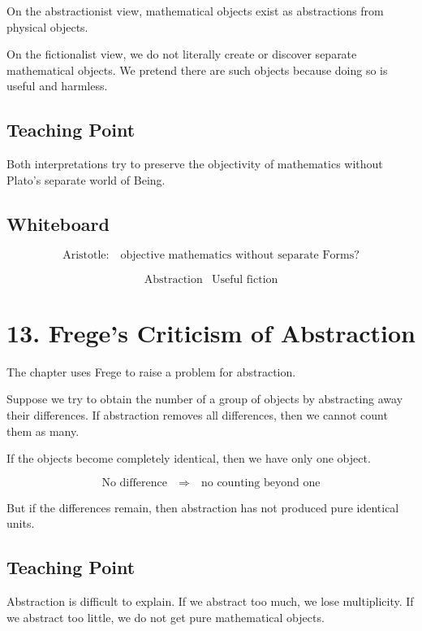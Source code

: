 \documentclass[11pt]{article}
\begin{document}
On the abstractionist view, mathematical objects exist as abstractions from physical objects.

On the fictionalist view, we do not literally create or discover separate mathematical
objects. We pretend there are such objects because doing so is useful and harmless.

\subsection*{Teaching Point}

Both interpretations try to preserve the objectivity of mathematics without Plato's
separate world of Being.

\subsection*{Whiteboard}

\[
\text{Aristotle:}
\quad
\text{objective mathematics without separate Forms?}
\]

\[
\begin{array}{c|c}
\text{Abstraction} & \text{Useful fiction}
\end{array}
\]

\section*{13. Frege's Criticism of Abstraction}

The chapter uses Frege to raise a problem for abstraction.

Suppose we try to obtain the number of a group of objects by abstracting away their
differences. If abstraction removes all differences, then we cannot count them as many.

If the objects become completely identical, then we have only one object.

\[
\text{No difference}
\quad \Rightarrow \quad
\text{no counting beyond one}
\]

But if the differences remain, then abstraction has not produced pure identical units.

\subsection*{Teaching Point}

Abstraction is difficult to explain. If we abstract too much, we lose multiplicity. If we
abstract too little, we do not get pure mathematical objects.
\end{document}
